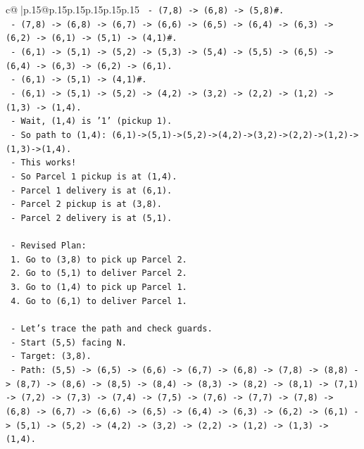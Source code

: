 \documentclass{article}
\begin{document}
{\begin{supertabular}{c@{$\;$}|p{.15\linewidth}@{}p{.15\linewidth}p{.15\linewidth}p{.15\linewidth}p{.15\linewidth}p{.15\linewidth}}
{{{\texttt{        {-} (7,8) {-}> (6,8) {-}> (5,8)\#.} \\
\texttt{        {-} (7,8) {-}> (6,8) {-}> (6,7) {-}> (6,6) {-}> (6,5) {-}> (6,4) {-}> (6,3) {-}> (6,2) {-}> (6,1) {-}> (5,1) {-}> (4,1)\#.} \\
\texttt{        {-} (6,1) {-}> (5,1) {-}> (5,2) {-}> (5,3) {-}> (5,4) {-}> (5,5) {-}> (6,5) {-}> (6,4) {-}> (6,3) {-}> (6,2) {-}> (6,1).} \\
\texttt{        {-} (6,1) {-}> (5,1) {-}> (4,1)\#.} \\
\texttt{        {-} (6,1) {-}> (5,1) {-}> (5,2) {-}> (4,2) {-}> (3,2) {-}> (2,2) {-}> (1,2) {-}> (1,3) {-}> (1,4).} \\
\texttt{        {-} Wait, (1,4) is '1' (pickup 1).} \\
\texttt{        {-} So path to (1,4): (6,1){-}>(5,1){-}>(5,2){-}>(4,2){-}>(3,2){-}>(2,2){-}>(1,2){-}>(1,3){-}>(1,4).} \\
\texttt{        {-} This works!} \\
\texttt{        {-} So Parcel 1 pickup is at (1,4).} \\
\texttt{        {-} Parcel 1 delivery is at (6,1).} \\
\texttt{        {-} Parcel 2 pickup is at (3,8).} \\
\texttt{        {-} Parcel 2 delivery is at (5,1).} \\
\\ 
\texttt{    {-} Revised Plan:} \\
\texttt{      1. Go to (3,8) to pick up Parcel 2.} \\
\texttt{      2. Go to (5,1) to deliver Parcel 2.} \\
\texttt{      3. Go to (1,4) to pick up Parcel 1.} \\
\texttt{      4. Go to (6,1) to deliver Parcel 1.} \\
\\ 
\texttt{    {-} Let's trace the path and check guards.} \\
\texttt{    {-} Start (5,5) facing N.} \\
\texttt{    {-} Target: (3,8).} \\
\texttt{      {-} Path: (5,5) {-}> (6,5) {-}> (6,6) {-}> (6,7) {-}> (6,8) {-}> (7,8) {-}> (8,8) {-}> (8,7) {-}> (8,6) {-}> (8,5) {-}> (8,4) {-}> (8,3) {-}> (8,2) {-}> (8,1) {-}> (7,1) {-}> (7,2) {-}> (7,3) {-}> (7,4) {-}> (7,5) {-}> (7,6) {-}> (7,7) {-}> (7,8) {-}> (6,8) {-}> (6,7) {-}> (6,6) {-}> (6,5) {-}> (6,4) {-}> (6,3) {-}> (6,2) {-}> (6,1) {-}> (5,1) {-}> (5,2) {-}> (4,2) {-}> (3,2) {-}> (2,2) {-}> (1,2) {-}> (1,3) {-}> (1,4).} \\
}}}
\end{supertabular}}
\end{document}
